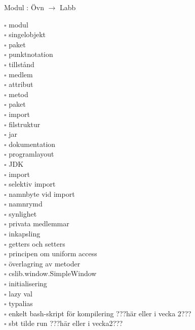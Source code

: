 
    Modul : Övn  $\rightarrow$ Labb 
    \begin{multicols}{3}\SlideFontTiny
    $\square$ modul \\
$\square$ singelobjekt \\
$\square$ paket \\
$\square$ punktnotation \\
$\square$ tillstånd \\
$\square$ medlem \\
$\square$ attribut \\
$\square$ metod \\
$\square$ paket \\
$\square$ import \\
$\square$ filstruktur \\
$\square$ jar \\
$\square$ dokumentation \\
$\square$ programlayout \\
$\square$ JDK \\
$\square$ import \\
$\square$ selektiv import \\
$\square$ namnbyte vid import \\
$\square$ namnrymd \\
$\square$ synlighet \\
$\square$ privata medlemmar \\
$\square$ inkapsling \\
$\square$ getters och setters \\
$\square$ principen om uniform access \\
$\square$ överlagring av metoder \\
$\square$ cslib.window.SimpleWindow \\
$\square$ initialisering \\
$\square$ lazy val \\
$\square$ typalias \\
$\square$ enkelt bash-skript för kompilering ???här eller i vecka 2??? \\
$\square$ sbt tilde run ???här eller i vecka2??? \\
    \end{multicols}
    